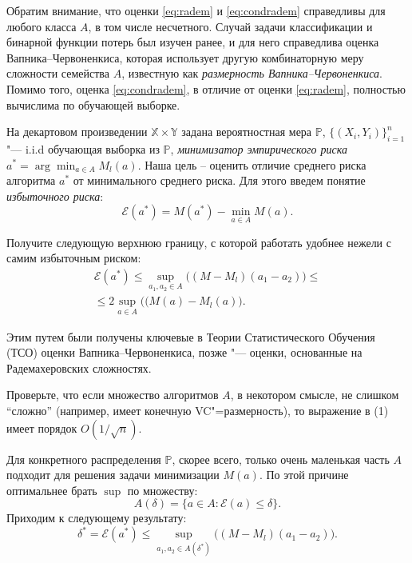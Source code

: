 
\begin{remark}
Обратим внимание, что оценки \eqref{eq:radem} и \eqref{eq:condradem} справедливы для любого класса $ A$, в том числе несчетного.
Случай задачи классификации и бинарной функции потерь был изучен ранее, и для него справедлива оценка  Вапника--Червоненкиса, которая использует другую комбинаторную меру сложности семейства $ A$, известную как {\it  размерность Вапника--Червоненкиса}.
Помимо того, оценка \eqref{eq:condradem}, в отличие от оценки \eqref{eq:radem}, полностью вычислима по обучающей выборке.
\end{remark}

\begin{problem}
На декартовом произведении $\mathbb{X}\times\mathbb{Y}$  задана вероятностная мера
$\mathbb{P}$,  $\{(X_i,Y_i)\}_{i=1}^n$ "--- i.i.d обучающая выборка из $\mathbb{P}$, {\it минимизатор эмпирического риска} $a^* = \arg\min_{a\in A} M_l(a)$. Наша цель -- оценить отличие среднего риска алгоритма  $a^*$ от  минимального среднего риска. 
Для этого введем понятие {\it избыточного риска}: 
\[\mathcal{E}(a^*) = M(a^*) - \min_{a\in A} M(a).\]

Получите следующую верхнюю границу, с которой работать удобнее нежели с самим избыточным риском:   
\begin{gather*}
\mathcal{E}(a^*) 
\leqslant{}\sup_{a_1, a_2 \in A} \bigl( (M - M_l)(a_1 - a_2)\bigr)
\leqslant{}\\
\tag{1}
{}\leqslant 2\sup_{a\in A} \bigl( (M(a) - M_l(a)\bigr).
\end{gather*}

Этим путем были получены ключевые в Теории Статистического Обучения (ТСО) оценки Вапника--Червоненкиса, позже "--- оценки, основанные на Радемахеровских сложностях.

Проверьте, что если множество алгоритмов $A$, в некотором смысле, не слишком ``сложно'' (например, имеет конечную VC"=размерность), то выражение в (1) имеет порядок $O(1/\sqrt{n})$.

Для конкретного распределения $\mathbb{P}$, скорее всего, только очень маленькая часть $A$ подходит для решения задачи минимизации $M(a)$. По этой причине оптимальнее брать $\sup$ по множеству:
\[
A(\delta) = \{a\in A \colon \mathcal{E}(a) \leqslant \delta\}.
\]
Приходим к следующему результату:
\[
\delta^* = \mathcal{E}(a^*) \leqslant 
\sup_{a_1, a_2 \in A(\delta^*)} \bigl( (M - M_l)(a_1-a_2)\bigr).
\]


\end{problem}
